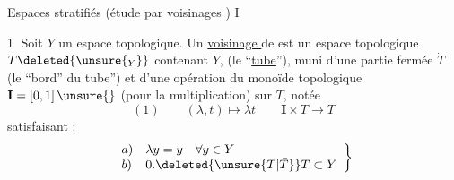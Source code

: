 Espaces stratifiés (étude par voisinages 
)
\textcircled{I}

\textcircled{1} Soit $Y$ un espace topologique. Un \uline{voisinage } 
 de 
 est un espace topologique
$T\deleted{\unsure{_Y}}$ contenant $Y$,
(le ``\uline{tube}''), muni d'une partie fermée $\dot T$
 (le ``bord'' du tube'') et d'une opération du monoïde topologique
$\mathbf{I}=[0,1]\,\unsure{}$ (pour la multiplication) sur $T$, notée
\[
(1)\qquad (\lambda,t)\longmapsto\lambda t
\qquad \mathbf{I}\times T\longrightarrow T
\]
satisfaisant :
\[
\left.\begin{array}{ll}
a)&\lambda y=y\quad\forall y\in Y\\
b)&0.\deleted{\unsure{T|\bar T}}T\subset Y
\end{array}\right\}
\]

